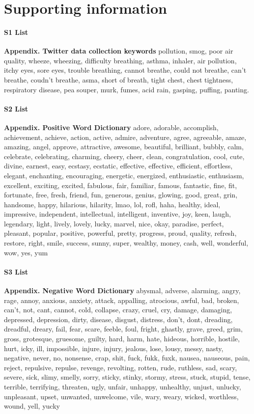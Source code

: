 \documentclass[10pt,letterpaper]{article}
\begin{document}
\section*{Supporting information}
\paragraph*{S1 List}
\label{S1_List}
{\bf Appendix. Twitter data collection keywords} pollution, smog, poor air quality, wheeze, wheezing, difficulty breathing, asthma, inhaler, air pollution, itchy eyes, sore eyes, trouble breathing, cannot breathe, could not breathe, can't breathe, coudn't breathe, asma, short of breath, tight chest, chest tightness, respiratory disease, pea souper, murk, fumes, acid rain, gasping, puffing, panting.

\paragraph*{S2 List}
\label{S2_List}
{\bf Appendix. Positive Word Dictionary} adore, adorable, accomplish, achievement, achieve, action, active, admire, adventure, agree, agreeable, amaze, amazing, angel, approve, attractive, awesome, beautiful, brilliant, bubbly, calm, celebrate, celebrating, charming, cheery, cheer, clean, congratulation, cool, cute, divine, earnest, easy, ecstasy, ecstatic, effective, effective, efficient, effortless, elegant, enchanting, encouraging, energetic, energized, enthusiastic, enthusiasm, excellent, exciting, excited, fabulous, fair, familiar, famous, fantastic, fine, fit, fortunate, free, fresh, friend, fun, generous, genius, glowing, good, great, grin, handsome, happy, hilarious, hilarity, lmao, lol, rofl, haha, healthy, ideal, impressive, independent, intellectual, intelligent, inventive, joy, keen, laugh, legendary, light, lively, lovely, lucky, marvel, nice, okay, paradise, perfect, pleasant, popular, positive, powerful, pretty, progress, proud, quality, refresh, restore, right, smile, success, sunny, super, wealthy, money, cash, well, wonderful, wow, yes, yum

\paragraph*{S3 List}
\label{S3_List}
{\bf Appendix. Negative Word Dictionary} abysmal, adverse, alarming, angry, rage, annoy, anxious, anxiety, attack, appalling, atrocious, awful, bad, broken, can't, not, cant, cannot, cold, collapse, crazy, cruel, cry, damage, damaging, depressed, depression, dirty, disease, disgust, distress, don't, dont, dreading, dreadful, dreary, fail, fear, scare, feeble, foul, fright, ghastly, grave, greed, grim, gross, grotesque, gruesome, guilty, hard, harm, hate, hideous, horrible, hostile, hurt, icky, ill, impossible, injure, injury, jealous, lose, lousy, messy, nasty, negative, never, no, nonsense, crap, shit, fuck, fukk, fuxk, nausea, nauseous, pain, reject, repulsive, repulse, revenge, revolting, rotten, rude, ruthless, sad, scary, severe, sick, slimy, smelly, sorry, sticky, stinky, stormy, stress, stuck, stupid, tense, terrible, terrifying, threaten, ugly, unfair, unhappy, unhealthy, unjust, unlucky, unpleasant, upset, unwanted, unwelcome, vile, wary, weary, wicked, worthless, wound, yell, yucky
\end{document}
